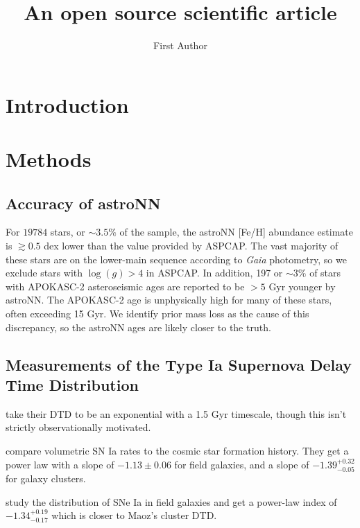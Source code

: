 \documentclass[twocolumn]{aastex631}
\begin{document}
\title{An open source scientific article}

\author[0000-0000-0000-0000]{First Author}

\begin{abstract}
    \blindtext
\end{abstract}

\section{Introduction}
\Blindtext[4]

\section{Methods}

\subsection{Accuracy of astroNN}

For $19784$ stars, or $\sim3.5\%$ of the sample, the astroNN [Fe/H] abundance estimate is $\gtrsim0.5$ dex lower than the value provided by ASPCAP. The vast majority of these stars are on the lower-main sequence according to \textit{Gaia} photometry, so we exclude stars with $\log(g) > 4$ in ASPCAP. In addition, 197 or $\sim3\%$ of stars with APOKASC-2 asteroseismic ages are reported to be $>5$ Gyr younger by astroNN. The APOKASC-2 age is unphysically high for many of these stars, often exceeding 15 Gyr. We identify prior mass loss as the cause of this discrepancy, so the astroNN ages are likely closer to the truth.

\subsection{Measurements of the Type Ia Supernova Delay Time Distribution}

\citet{Schonrich2009-RadialMixing} take their DTD to be an exponential with a 1.5 Gyr timescale, though this isn't strictly observationally motivated.

\citet{Maoz2017-CosmicDTD} compare volumetric SN Ia rates to the cosmic star formation history. They get a power law with a slope of $-1.13\pm 0.06$ for field galaxies, and a slope of $-1.39^{+0.32}_{-0.05}$ for galaxy clusters.

\citet{Heringer2019-FieldGalaxyDTD} study the distribution of SNe Ia in field galaxies and get a power-law index of $-1.34^{+0.19}_{-0.17}$ which is closer to Maoz's cluster DTD.
\end{document}
